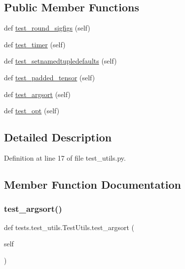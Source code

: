 \subsection*{Public Member Functions}
\begin{DoxyCompactItemize}
\item 
def \hyperlink{classtests_1_1test__utils_1_1TestUtils_aa020fc67900c834a020730f29cacc916}{test\+\_\+round\+\_\+sigfigs} (self)
\item 
def \hyperlink{classtests_1_1test__utils_1_1TestUtils_aa4b5f19e38d6da7a8947226c60007184}{test\+\_\+timer} (self)
\item 
def \hyperlink{classtests_1_1test__utils_1_1TestUtils_a211bff449c261cce734e51e3a937d1af}{test\+\_\+setnamedtupledefaults} (self)
\item 
def \hyperlink{classtests_1_1test__utils_1_1TestUtils_a9d3d0280ce67a3e6b039b9184844dc45}{test\+\_\+padded\+\_\+tensor} (self)
\item 
def \hyperlink{classtests_1_1test__utils_1_1TestUtils_ad9ee6ef6b6ce7d9f168234eddf5d3716}{test\+\_\+argsort} (self)
\item 
def \hyperlink{classtests_1_1test__utils_1_1TestUtils_a595e1217b715af6a4670ee244c9aa61f}{test\+\_\+opt} (self)
\end{DoxyCompactItemize}


\subsection{Detailed Description}


Definition at line 17 of file test\+\_\+utils.\+py.



\subsection{Member Function Documentation}
\mbox{\label{classtests_1_1test__utils_1_1TestUtils_ad9ee6ef6b6ce7d9f168234eddf5d3716}} 
\subsubsection{\texorpdfstring{test\+\_\+argsort()}{test\_argsort()}}
{\footnotesize\ttfamily def tests.\+test\+\_\+utils.\+Test\+Utils.\+test\+\_\+argsort (\begin{DoxyParamCaption}\item[{}]{self }\end{DoxyParamCaption})}



